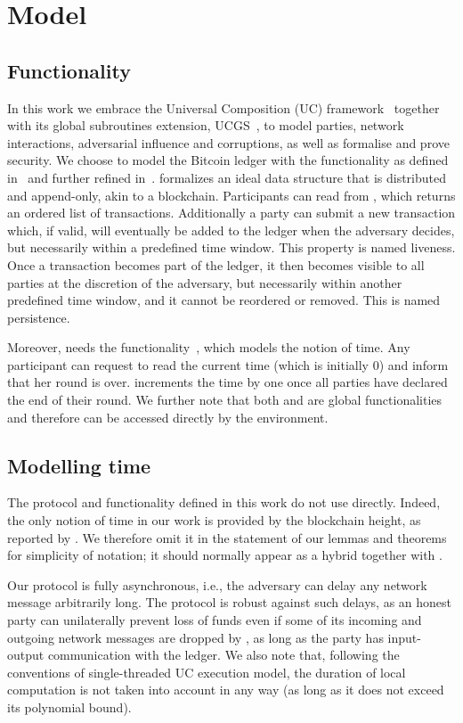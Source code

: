 \section{Model}

  \subsection{\ledger Functionality}
  In this work we embrace the Universal Composition (UC) framework~\cite{uc}
  together with its global subroutines extension,
  UCGS~\cite{DBLP:conf/tcc/BadertscherCHTZ20}, to
  model parties, network interactions, adversarial influence and corruptions, as
  well as formalise and prove security. We choose to model the Bitcoin ledger
  with the \ledger
  functionality as defined in~\cite{BMTZ17} and further refined
  in~\cite{genesis}. \ledger formalizes an ideal data structure that is
  distributed and append-only, akin to a blockchain. Participants can read from
  \ledger, which returns an ordered list of transactions. Additionally a party
  can submit a new transaction which, if valid, will eventually be added to the
  ledger when the adversary decides, but necessarily within a predefined time
  window. This property is named liveness. Once a transaction becomes part of
  the ledger, it then becomes visible to all parties at the discretion of the
  adversary, but necessarily within another predefined time window, and it
  cannot be reordered or removed. This is named persistence.

  Moreover, \ledger needs the \Fclock
  functionality~\cite{DBLP:conf/tcc/KatzMTZ13}, which models the notion of time.
  Any \Fclock participant can request to read the current time (which is
  initially 0) and inform \Fclock that her round is over. \Fclock increments the
  time by one once all parties have declared the end of their round. We further note that both
  \ledger and \Fclock are global
  functionalities~\cite{DBLP:conf/tcc/BadertscherCHTZ20} and therefore can be
  accessed directly by the environment.

  \subsection{Modelling time}
  The protocol and functionality defined in this work do not use \Fclock
  directly. Indeed, the only notion of time in our work is provided by the
  blockchain height, as reported by \ledger. We therefore omit it in the
  statement of our lemmas and theorems for simplicity of notation; it should
  normally appear as a hybrid together with \ledger.

  Our protocol is fully asynchronous, i.e., the adversary can delay any network
  message arbitrarily long. The protocol is robust against such delays, as an
  honest party can unilaterally prevent loss of funds even if some of its
  incoming and outgoing network messages are dropped by \adversary, as long as
  the party has input-output communication with the ledger. We also note that,
  following the conventions of single-threaded UC execution model, the duration of local
  computation is not taken into account in any way (as long as it does not
  exceed its polynomial bound).
